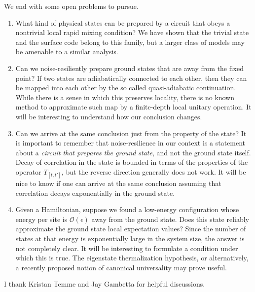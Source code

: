 \documentclass[prx,aps,amsmath,amssymb,floatfix,superscriptaddress,11pt,tightenlines,longbibliography,onecolumn,notitlepage]{revtex4-1}
\begin{document}
We end with some open problems to pursue.
\begin{enumerate}
\item  What kind of physical states can be prepared by a circuit that obeys a nontrivial local rapid mixing condition? We have shown that the trivial state and the surface code belong to this family, but a larger class of models\cite{Levin2005} may be amenable to a similar analysis.

\item Can we noise-resiliently prepare ground states that are away from the fixed point? If two states are adiabatically connected to each other, then they can be mapped into each other by the so called quasi-adiabatic continuation\cite{Hastings2005}. While there is a sense in which this preserves locality, there is no known method to approximate such map by a finite-depth local unitary operation. It will be interesting to understand how our conclusion changes.

\item Can we arrive at the same conclusion just from the property of the state? It is important to remember that noise-resilience in our context is a statement about a \emph{circuit that prepares the ground state}, and not the ground state itself. Decay of correlation in the state is bounded in terms of the properties of the operator $T_{[t,t']}$, but the reverse direction generally does not work. It will be nice to know if one can arrive at the same conclusion assuming that correlation decays exponentially in the ground state.

\item Given a Hamiltonian, suppose we found a low-energy configuration whose energy per site is $\mathcal{O}(\epsilon)$ away from the ground state. Does this state reliably approximate the ground state local expectation values? Since the number of states at that energy is exponentially large in the system size, the answer is not completely clear. It will be interesting to formulate a condition under which this is true. The eigenstate thermalization hypothesis\cite{Deutsch1991,Srednicki1994}, or alternatively, a recently proposed notion of canonical universality\cite{Dymarsky2017} may prove useful. 
\end{enumerate}
\begin{acknowledgments}
I thank Kristan Temme and Jay Gambetta for helpful discussions.
\end{acknowledgments}



\end{document}
